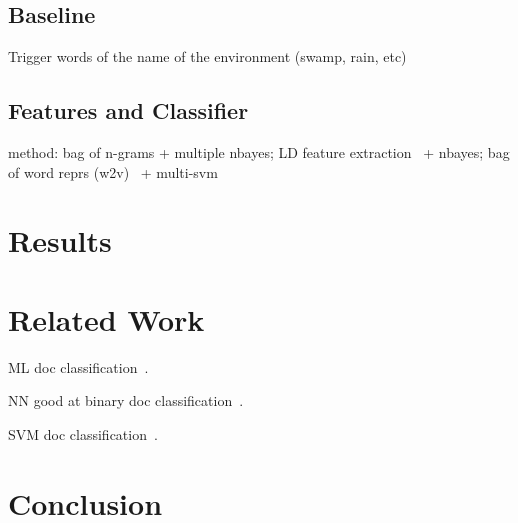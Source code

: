 \documentclass[11pt]{article}
\begin{document}
\subsection{Baseline}
Trigger words of the name of the environment (swamp, rain, etc)

\subsection{Features and Classifier}
method: bag of n-grams + multiple nbayes; LD feature extraction~\cite{lui2011cross} + nbayes; bag of word reprs (w2v)~\cite{mikolov2013efficient} + multi-svm

\section{Results}

\section{Related Work}


ML doc classification~\cite{sebastiani2002machine}.

NN good at binary doc classification~\cite{derczynski2006machine}.

SVM doc classification~\cite{isa2008text}.

\section{Conclusion}

\iffalse
\section*{Acknowledgments}
This project has received funding from the European Union’s Seventh Framework Programme for research, technological development and demonstration under grant agreement No. 611233, \textsc{Pheme}.
ah, was anything funding this? could anything be associated with this?? ahhh, erm
\fi



\end{document}
